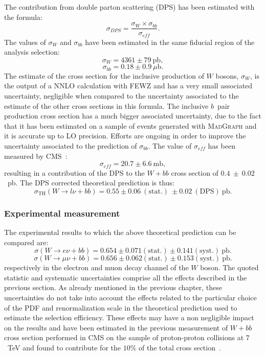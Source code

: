 The contribution from double parton scattering (DPS) has been estimated with the 
formula:
$$\sigma_{DPS} = \frac{\sigma_{W} \times \sigma_{bb}}{\sigma_{eff}} \mathrm{.}$$
The values of $\sigma_{W}$ and $\sigma_{bb}$ have been estimated 
in the same fiducial region of the analysis selection:
$$\sigma_{W} = 4361 \pm 79 ~\mathrm{pb,}$$
$$\sigma_{bb} = 0.18 \pm 0.9 ~\mu \mathrm{b.}$$
The estimate of the cross section for the inclusive production of $W$ bosons, $\sigma_{W}$, 
is the output of a NNLO calculation with \textsc{FEWZ} and has a very small 
associated uncertainty, negligible when compared to the uncertainty associated 
to the estimate of the other cross sections in this formula. 
The inclusive $b$~pair production cross section has a much bigger 
associated uncertainty, due to the fact that it has been estimated on a sample of 
events generated with \textsc{MadGraph} and it is accurate up to LO precision.
Efforts are ongoing in order to improve the uncertainty associated to the 
prediction of $\sigma_{bb}$.
The value of $\sigma_{eff}$ has been measured by CMS~\cite{sigmaeffCMS}:
$$\sigma_{eff} = 20.7 \pm 6.6  ~\mathrm{mb,}$$
resulting in a contribution of the DPS to the $W+bb$ cross section of 
$0.4~\pm~0.02$~pb. The DPS corrected theoretical prediction is thus:
$$\sigma_{\mathrm{TH}} (W \rightarrow l \nu + bb) = 0.55 \pm 0.06~\mathrm{(stat.)}~ \pm 0.02~\mathrm{(DPS)}~\mathrm{pb.}$$

\subsubsection{Experimental measurement}

The experimental results to which the above theoretical prediction 
can be compared are:
$$\sigma (W \rightarrow e \nu + bb) = 0.654 \pm 0.071\mathrm{(stat.)} \pm 0.141\mathrm{(syst.)}~\mathrm{pb.}$$
$$\sigma (W \rightarrow \mu \nu + bb) = 0.656 \pm 0.062\mathrm{(stat.)} \pm 0.153\mathrm{(syst.)}~\mathrm{pb.}$$
respectively in the electron and muon decay channel of the $W$ boson.
The quoted statistic and systematic uncertainties comprise all the effects 
described in the previous section. 
As already mentioned in the previous chapter, these uncertainties
do not take into account the effects related to the particular choice of 
the PDF and renormalization scale in the theoretical prediction used to estimate 
the selection efficiency. These effects may have a non negligible impact on the results and 
have been estimated in the previous measurement of $W+bb$ cross section performed 
in CMS on the sample of proton-proton collisions at $7$~TeV and found to contribute 
for the $10\%$ of the total cross section~\cite{cmsWbb7tev}.

